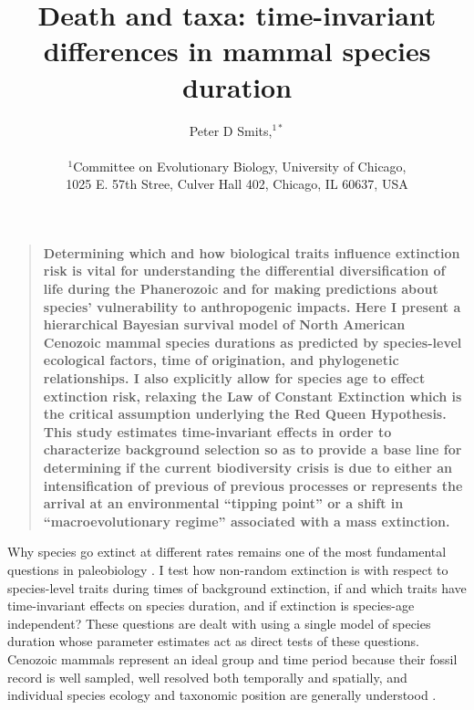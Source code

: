 \documentclass[12pt]{article}
\title{Death and taxa: time-invariant differences in mammal species duration}
\author
{Peter D Smits,$^{1\ast}$\\
\\
\normalsize{$^{1}$Committee on Evolutionary Biology, University of Chicago,}\\
\normalsize{1025 E. 57th Stree, Culver Hall 402, Chicago, IL 60637, USA}\\
}
\date{}
\newenvironment{sciabstract}{%
\begin{quote} \bf}
{\end{quote}}
\begin{document}
 


\baselineskip24pt


\maketitle 


\begin{sciabstract}
  Determining which and how biological traits influence extinction risk is vital for understanding the differential diversification of life during the Phanerozoic and for making predictions about species' vulnerability to anthropogenic impacts. Here I present a hierarchical Bayesian survival model of North American Cenozoic mammal species durations as predicted by species-level ecological factors, time of origination, and phylogenetic relationships. I also explicitly allow for species age to effect extinction risk, relaxing the Law of Constant Extinction which is the critical assumption underlying the Red Queen Hypothesis. This study estimates time-invariant effects in order to characterize background selection so as to provide a base line for determining if the current biodiversity crisis is due to either an intensification of previous of previous processes or represents the arrival at an environmental ``tipping point'' or a shift in ``macroevolutionary regime'' associated with a mass extinction.
\end{sciabstract}

Why species go extinct at different rates remains one of the most fundamental questions in paleobiology \cite{Simpson1944,VanValen1973,Raup1994,Quental2013,Wagner2014b}. I test how non-random extinction is with respect to species-level traits during times of background extinction, if and which traits have time-invariant effects on species duration, and if extinction is species-age independent? These questions are dealt with using a single model of species duration whose parameter estimates act as direct tests of these questions. Cenozoic mammals represent an ideal group and time period because their fossil record is well sampled, well resolved both temporally and spatially, and individual species ecology and taxonomic position are generally understood \cite{Alroy2009,Liow2008,Smith2004,Quental2013,Simpson1944,Tomiya2013,Marcot2014}. 
\end{document}
